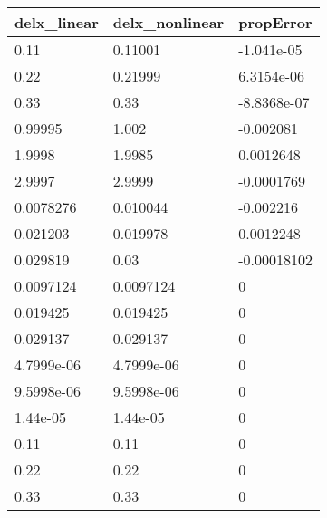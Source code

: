 \begin{tabular}{lll}
delx_linear & delx_nonlinear & propError \\ 
\hline 
0.11 & 0.11001 & -1.041e-05 \\ 
0.22 & 0.21999 & 6.3154e-06 \\ 
0.33 & 0.33 & -8.8368e-07 \\ 
0.99995 & 1.002 & -0.002081 \\ 
1.9998 & 1.9985 & 0.0012648 \\ 
2.9997 & 2.9999 & -0.0001769 \\ 
0.0078276 & 0.010044 & -0.002216 \\ 
0.021203 & 0.019978 & 0.0012248 \\ 
0.029819 & 0.03 & -0.00018102 \\ 
0.0097124 & 0.0097124 & 0 \\ 
0.019425 & 0.019425 & 0 \\ 
0.029137 & 0.029137 & 0 \\ 
4.7999e-06 & 4.7999e-06 & 0 \\ 
9.5998e-06 & 9.5998e-06 & 0 \\ 
1.44e-05 & 1.44e-05 & 0 \\ 
0.11 & 0.11 & 0 \\ 
0.22 & 0.22 & 0 \\ 
0.33 & 0.33 & 0 \\ 
\hline 
\end{tabular}